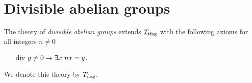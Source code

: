 
%
% 



\section{Divisible abelian groups}\label{dag}

The theory of \emph{divisible abelian groups\/} extends $T_{\rm tfag}$ with the following axioms for all integers $n\neq0$
\begin{itemize}
\item[div] $y\neq0\rightarrow\exists x\ nx=y$.
\end{itemize} 
We denote this theory by \emph{$T_{\rm dag}$}.

